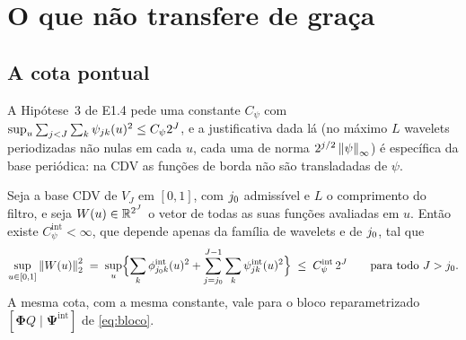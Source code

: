 \documentclass[11pt,a4paper]{article}
\newcommand{\bPsi}{\boldsymbol{\Psi}}
\newcommand{\bPhi}{\boldsymbol{\Phi}}
\newcommand{\Cpsiint}{C_{\psi}^{\mathrm{int}}}
\begin{document}
\section{O que não transfere de graça}

\subsection*{A cota pontual}

A Hipótese~3 de E1.4 pede uma constante $C_{\psi}$ com
$\sup_{u}\sum_{j<J}\sum_{k}\psi_{jk}(u)^{2} \le C_{\psi}2^{J}$, e
a justificativa dada lá (no máximo $L$ wavelets periodizadas não nulas em cada
$u$, cada uma de norma $2^{j/2}\left\lVert \psi \right\rVert_{\infty}$) é específica da base
periódica: na CDV as funções de borda não são transladadas de $\psi$.

\begin{lemma}\label{lem:pontual}
Seja a base CDV de $V_{J}$ em $[0,1]$, com $j_{0}$ admissível e $L$ o
comprimento do filtro, e seja $W(u) \in \mathbb{R}^{2^{J}}$ o vetor de todas as suas
funções avaliadas em $u$. Então existe $\Cpsiint < \infty$, que depende apenas
da família de wavelets e de $j_{0}$, tal que
\[
  \sup_{u\in[0,1]}\norm{W(u)}_{2}^{2}
  \;=\; \sup_{u}\Bigl\{\sum_{\tsl}\phi^{\mathrm{int}}_{\jzero\tsl}(u)^{2}
  + \sum_{\lev=\jzero}^{J-1}\sum_{\tsl}\psi^{\mathrm{int}}_{\lev\tsl}(u)^{2}
  \Bigr\}
  \;\le\; \Cpsiint\,2^{J}
  \qquad\text{para todo } J > \jzero .
\]
A mesma cota, com a mesma constante, vale para o bloco reparametrizado
$[\bPhi Q \mid \bPsi^{\mathrm{int}}]$ de \eqref{eq:bloco}.
\end{lemma}
\end{document}
